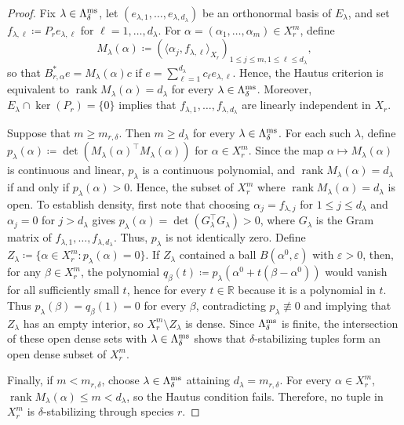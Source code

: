 \documentclass[letterpaper, 10pt, conference]{ieeeconf}
\newcommand{\R}{\mathbb{R}}
\begin{document}
\begin{proof}
    Fix $\lambda \in \Lambda_\delta^{\rm ms}$, let $(e_{\lambda,1}, \ldots, e_{\lambda,d_\lambda})$ be an orthonormal basis of $E_\lambda$, and set $f_{\lambda,\ell} \coloneqq P_r e_{\lambda,\ell}$ for $\ell = 1, \ldots, d_\lambda$.
    For $\alpha = (\alpha_1, \ldots, \alpha_m) \in X_r^m$, define
    \[
    M_\lambda(\alpha) \coloneqq \left(\langle \alpha_j, f_{\lambda,\ell} \rangle_{X_r}\right)_{1 \le j \le m, 1 \le \ell \le d_\lambda},
    \]
    so that $B_{r,\alpha}^\ast e = M_\lambda(\alpha) c$ if $e = \sum_{\ell=1}^{d_\lambda} c_\ell e_{\lambda,\ell}$. 
    Hence, the Hautus criterion is equivalent to $\operatorname{rank} M_\lambda(\alpha) = d_\lambda$ for every $\lambda \in \Lambda_\delta^{\rm ms}$.
    Moreover, $E_\lambda \cap \ker(P_r) = \{0\}$ implies that $f_{\lambda,1}, \ldots, f_{\lambda,d_\lambda}$ are linearly independent in $X_r$.

    Suppose that $m \ge m_{r,\delta}$.
    Then $m \ge d_\lambda$ for every $\lambda \in \Lambda_\delta^{\rm ms}$. 
    For each such $\lambda$, define $p_\lambda(\alpha) \coloneqq \det(M_\lambda(\alpha)^\top M_\lambda(\alpha))$ for $\alpha \in X_r^m$.
    Since the map $\alpha \mapsto M_\lambda(\alpha)$ is continuous and linear, $p_\lambda$ is a continuous polynomial, and $\operatorname{rank} M_\lambda(\alpha) = d_\lambda$ if and only if $p_\lambda(\alpha) > 0$.
    Hence, the subset of $X_r^m$ where $\operatorname{rank} M_\lambda(\alpha) = d_\lambda$ is open.
    To establish density, first note that choosing $\alpha_j = f_{\lambda,j}$ for $1 \le j \le d_\lambda$ and $\alpha_j = 0$ for $j > d_\lambda$ gives $p_\lambda(\alpha) = \det(G_\lambda^\top G_\lambda) > 0$, where $G_\lambda$ is the Gram matrix of $f_{\lambda,1}, \ldots, f_{\lambda,d_\lambda}$. 
    Thus, $p_\lambda$ is not identically zero.
    Define $Z_\lambda \coloneqq \{\alpha \in X_r^m : p_\lambda(\alpha) = 0\}$.
    If $Z_\lambda$ contained a ball $B(\alpha^0, \varepsilon)$ with $\varepsilon > 0$, then, for any $\beta \in X_r^m$, the polynomial $q_\beta(t) \coloneqq p_\lambda(\alpha^0 + t(\beta - \alpha^0))$ would vanish for all sufficiently small $t$, hence for every $t \in \R$ because it is a polynomial in $t$.
    Thus $p_\lambda(\beta) = q_\beta(1) = 0$ for every $\beta$, contradicting $p_\lambda \not \equiv 0$ and implying that $Z_\lambda$ has an empty interior, so $X_r^m \setminus Z_\lambda$ is dense.
    Since $\Lambda_\delta^{\rm ms}$ is finite, the intersection of these open dense sets with $\lambda \in \Lambda_\delta^{\rm ms}$ shows that $\delta$-stabilizing tuples form an open dense subset of $X_r^m$.
    
    Finally, if $m < m_{r,\delta}$, choose $\lambda \in \Lambda_\delta^{\rm ms}$ attaining $d_\lambda = m_{r,\delta}$.
    For every $\alpha \in X_r^m$, $\operatorname{rank} M_\lambda(\alpha) \le m < d_\lambda$, so the Hautus condition fails. 
    Therefore, no tuple in $X_r^m$ is $\delta$-stabilizing through species $r$.
\end{proof}
\end{document}
